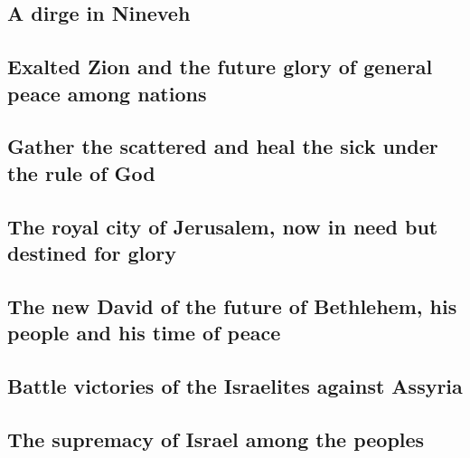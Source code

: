 \begin{paracol}{2}
\begin{otherlanguage}{english}
\hypertarget{a-dirge-in-nineveh}{%
\subsection{A dirge in Nineveh}\label{a-dirge-in-nineveh}}

\hypertarget{exalted-zion-and-the-future-glory-of-general-peace-among-nations}{%
\subsection{Exalted Zion and the future glory of general peace among
nations}\label{exalted-zion-and-the-future-glory-of-general-peace-among-nations}}

\hypertarget{gather-the-scattered-and-heal-the-sick-under-the-rule-of-god}{%
\subsection{Gather the scattered and heal the sick under the rule of
God}\label{gather-the-scattered-and-heal-the-sick-under-the-rule-of-god}}

\hypertarget{the-royal-city-of-jerusalem-now-in-need-but-destined-for-glory}{%
\subsection{The royal city of Jerusalem, now in need but destined for
glory}\label{the-royal-city-of-jerusalem-now-in-need-but-destined-for-glory}}

\hypertarget{the-new-david-of-the-future-of-bethlehem-his-people-and-his-time-of-peace}{%
\subsection{The new David of the future of Bethlehem, his people and his
time of
peace}\label{the-new-david-of-the-future-of-bethlehem-his-people-and-his-time-of-peace}}

\hypertarget{battle-victories-of-the-israelites-against-assyria}{%
\subsection{Battle victories of the Israelites against
Assyria}\label{battle-victories-of-the-israelites-against-assyria}}

\hypertarget{the-supremacy-of-israel-among-the-peoples}{%
\subsection{The supremacy of Israel among the
peoples}\label{the-supremacy-of-israel-among-the-peoples}}


\end{otherlanguage}
\end{paracol}
